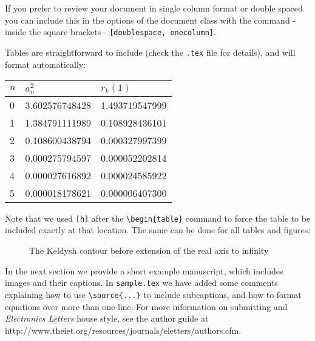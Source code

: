 \documentclass[11pt]{report}
\begin{document}
If you prefer to review your document in single column format or double spaced you can include this in the options of the document class with the command - inside the square brackets - \verb"[doublespace, onecolumn]".

Tables are straightforward to include (check the \verb".tex" file for details), and will format automatically:
\begin{table}[h]
{\begin{tabular}{|l|l|l|}\hline
$n$ & $a_{n}^{2}$ & $r_{k}(1)$\\\hline
0 & 3.602576748428 & 1.493719547999\\\hline
1 & 1.384791111989 & 0.108928436101\\\hline
2 & 0.108600438794 & 0.000327997399\\\hline
3 & 0.000275794597 & 0.000052202814\\\hline
4 & 0.000027616892 & 0.000024585922\\\hline
5 & 0.000018178621 & 0.000006407300\\\hline
\end{tabular}}{}
\end{table}

Note that we used \verb"[h]" after the \verb"\begin{table}" command to force the table to be included exactly at that location.  The same can be done for
all tables and figures:

\begin{figure}[h]
\caption{The Keldysh contour before extension of the real axis to infinity
\source{}}
\end{figure}

In the next section we provide a short example manuscript, which includes images and their captions.  In \verb"sample.tex" we have added some comments explaining how to use \verb"\source{...}" to include subcaptions, and how to format equations over more than one line.  For more information on submitting and \emph{Electronics Letters} house style, see the author guide at http://www.theiet.org/resources/journals/eletters/authors.cfm.
\end{document}
